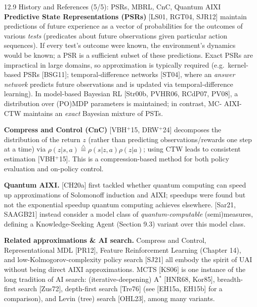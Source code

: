 \documentclass[aspectratio=169,10pt]{beamer}
\begin{document}
\begin{frame}[allowframebreaks]{12.9 History and References (5/5): PSRs, MBRL, CnC, Quantum AIXI}
\small
\textbf{Predictive State Representations (PSRs)} [LS01, RGT04, SJR12] maintain predictions
of future experience as a vector of probabilities for the outcomes of various
\emph{tests} (predicates about future observations given particular action sequences). If
every test's outcome were known, the environment's dynamics would be known; a PSR is a
sufficient subset of these predictions. Exact PSRs are impractical in large domains, so
approximation is typically required (e.g.\ kernel-based PSRs [BSG11]; temporal-difference
networks [ST04], where an \emph{answer network} predicts future observations and is
updated via temporal-difference learning). In model-based Bayesian RL [Str00b, PVHR06,
RCdP07, PV08], a distribution over (PO)MDP parameters is maintained; in contrast, MC-
AIXI-CTW maintains an \emph{exact} Bayesian mixture of PSTs.

\textbf{Compress and Control (CnC)} [VBH$^+$15, DRW$^+$24] decomposes the distribution of
the return $z$ (rather than predicting observations/rewards one step at a time) via
$\rho(z|s,a)\stackrel{\triangle}{=}\rho(s|z,a)\rho(z|a)$; using CTW leads to consistent
estimation [VBH$^+$15]. This is a compression-based method for both policy evaluation and
on-policy control.

\textbf{Quantum AIXI.} [CH20a] first tackled whether quantum computing can speed up
approximations of Solomonoff induction and AIXI; speedups were found but not the
exponential speedup quantum computing achieves elsewhere. [Sar21, SAAGB21] instead
consider a model class of \emph{quantum-computable} (semi)measures, defining a
Knowledge-Seeking Agent (Section 9.3) variant over this model class.

\textbf{Related approximations \& AI search.} Compress and Control, Representational MDL
[PR12], Feature Reinforcement Learning (Chapter 14), and low-Kolmogorov-complexity policy
search [SJ21] all embody the spirit of UAI without being direct AIXI approximations. MCTS
[KS06] is one instance of the long tradition of AI search: (iterative-deepening)
A$^*$ [HNR68, Kor85], breadth-first search [Zus72], depth-first search [Tre76] (see
[EH15a, EH15b] for a comparison), and Levin (tree) search [OHL23], among many variants.
\end{frame}
\end{document}
